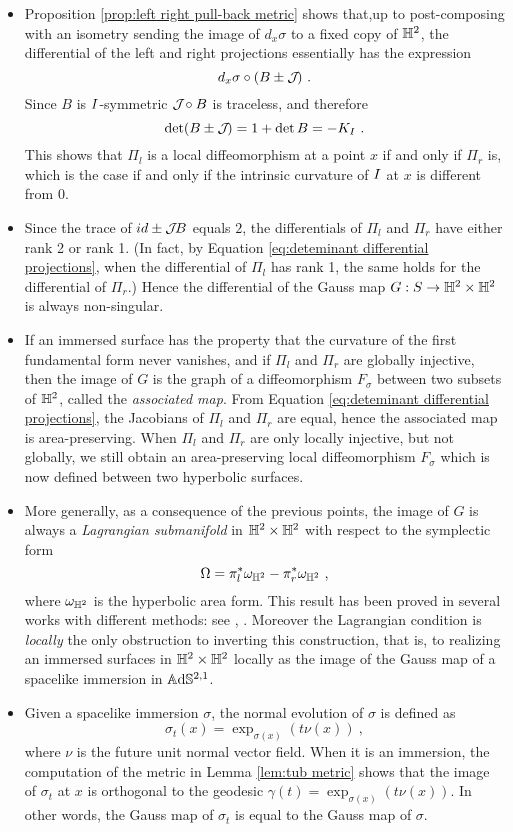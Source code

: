 \begin{itemize}[leftmargin=0.5cm]
\item Proposition \ref{prop:left right pull-back metric} shows that,up to post-composing with an isometry sending the image of $d_x\sigma$ to a fixed copy of $\mathbb{H}^2$, the differential of the left and right projections essentially has the expression 
\[
    d_x\sigma\circ(B\pm\mathcal{J}\!)~.
\]
Since $B$ is $I$-symmetric $\mathcal{J}\!\circ B$ is traceless, and therefore 
\begin{equation}\label{eq:deteminant differential projections}
\det(B\pm\mathcal{J}\!)=1+\det B=-K_I~.
\end{equation}
This shows that $\Pi_l$ is a local diffeomorphism at a point $x$ if and only if $\Pi_r$ is, which is the case if and only if the intrinsic curvature of $I$ at $x$ is different from $0$.
\item Since the trace of $id\pm\mathcal{J}\! B$ equals $2$, the differentials of $\Pi_l$ and $\Pi_r$ have either rank 2 or rank 1. (In fact, by Equation \eqref{eq:deteminant differential projections}, when the differential of $\Pi_l$ has rank 1, the same holds for the differential of $\Pi_r$.) Hence the differential of the Gauss map $G:S\to\mathbb{H}^2\times\mathbb{H}^2$ is always non-singular.
\item If an immersed surface has the property that the curvature of the first fundamental form never vanishes, and if $\Pi_l$ and $\Pi_r$ are globally injective, then the image of $G$ is the graph of a  diffeomorphism $F_\sigma$ between two subsets of $\mathbb{H}^2$,  called the \emph{associated map}. From Equation \eqref{eq:deteminant differential projections}, the Jacobians of $\Pi_l$ and $\Pi_r$ are equal, hence the associated map is area-preserving.
When $\Pi_l$ and $\Pi_r$ are only locally injective, but not globally, we still obtain an area-preserving local diffeomorphism $F_\sigma$ which is now defined between two hyperbolic surfaces.
\item More generally, as a consequence of the previous points, the image of $G$ is always a \emph{Lagrangian submanifold} in $\mathbb{H}^2\times\mathbb{H}^2$ with respect to the symplectic form 
\begin{equation} \label{eq symplectic form}
\Omega=\pi_l^*\omega_{\mathbb{H}^2}-\pi_r^*\omega_{\mathbb{H}^2}~,
\end{equation}
where $\omega_{\mathbb{H}^2}$ is the hyperbolic area form. 
This result has been proved in several works with different methods: see \cite{bonsante2017equivariant}, \cite{Seppi_2017}. Moreover the Lagrangian condition is \emph{locally} the only obstruction to inverting this construction, that is, to realizing an immersed surfaces in $\mathbb{H}^2\times\mathbb{H}^2$ locally as the image of the Gauss map of a spacelike immersion in $\mathbb{A}\mathrm{d}\mathbb{S}^{2,1}$.
\item Given a spacelike immersion $\sigma$,  the normal evolution of $\sigma$ is defined as 
\[
    \sigma_t(x)=\exp_{\sigma(x)}(t\nu(x))~,
\]
where $\nu$ is the future unit normal vector field. When it is an immersion, the computation of the metric in Lemma \ref{lem:tub metric} shows that the image of $\sigma_t$ at $x$ is orthogonal to the geodesic $\gamma(t)=\exp_{\sigma(x)}(t\nu(x))$. In other words, the Gauss map of $\sigma_t$ is equal to the Gauss map of $\sigma$. 
\end{itemize}

